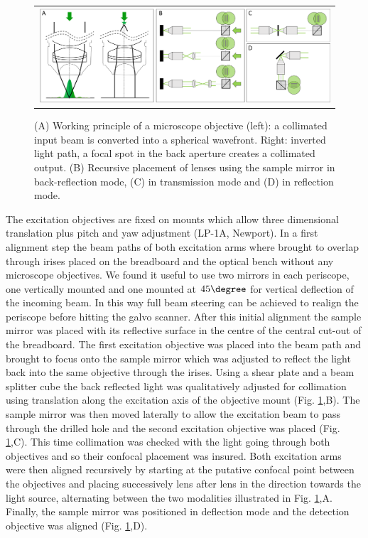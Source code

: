 \documentclass[12pt]{spieman}  %
\begin{document}
\begin{figure}
   \begin{center}
   \begin{tabular}{c}
   \includegraphics[width=\textwidth]{Panel4.eps}
   \end{tabular}
   \end{center}
   \caption{\label{fig:alignment2} (A) Working principle of a microscope objective (left): a collimated input beam is converted into a spherical wavefront. Right: inverted light path, a focal spot in the back aperture creates a collimated output. (B) Recursive placement of lenses using the sample mirror in back-reflection mode, (C) in transmission mode and (D) in reflection mode.} 
   \end{figure}

The excitation objectives are fixed on mounts which allow three dimensional translation plus pitch and yaw adjustment (LP-1A, Newport). In a first alignment step the beam paths of both excitation arms where brought to overlap through irises placed on the breadboard and the optical bench without any microscope objectives. We found it useful to use two mirrors in each periscope, one vertically mounted and one mounted at $45\degree$ for vertical deflection of the incoming beam. In this way full beam steering can be achieved to realign the periscope before hitting the galvo scanner. After this initial alignment the sample mirror was placed with its reflective surface in the centre of the central cut-out of the breadboard. The first excitation objective was placed into the beam path and brought to focus onto the sample mirror which was adjusted to reflect the light back into the same objective through the irises. Using a shear plate and a beam splitter cube the back reflected light was qualitatively adjusted for collimation using translation along the excitation axis of the objective mount (Fig. \ref{fig:alignment2},B). The sample mirror was then moved laterally to allow the excitation beam to pass through the drilled hole and the second excitation objective was placed (Fig. \ref{fig:alignment2},C). This time collimation was checked with the light going through both objectives and so their confocal placement was insured. Both excitation arms were then aligned recursively by starting at the putative confocal point between the objectives and placing successively lens after lens in the direction towards the light source, alternating between the two modalities illustrated in Fig. \ref{fig:alignment2},A. Finally, the sample mirror was positioned in deflection mode and the detection objective was aligned (Fig. \ref{fig:alignment2},D). 
\end{document}
